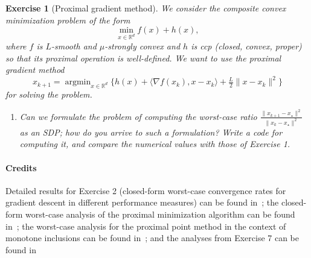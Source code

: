 \documentclass[11pt,a4paper]{article}
\newcommand{\inner}[2]{{\langle #1, #2\rangle}}
\DeclareMathOperator*{\argmin}{argmin}
\newtheorem{exercise}{Exercise}
\begin{document}
	
	\begin{exercise}[Proximal gradient method]\label{ex:pgm} We consider the composite convex minimization problem of the form
	\[ \min_{x\in\mathbb{R}^d} f(x)+h(x),\]
where $f$ is $L$-smooth and $\mu$-strongly convex and $h$ is ccp (closed, convex, proper) so that its proximal operation is well-defined. We want to use the proximal gradient method
\[ x_{k+1}=\argmin_{x\in\mathbb{R}^d}\{h(x)+\inner{\nabla f(x_k)}{x-x_k}+\tfrac{L}{2}\|x-x_k\|^2\}\]
for solving the problem.
	\begin{enumerate}
	\item Can we formulate the problem of computing the worst-case ratio $\frac{\|x_{k+1}-x_\star\|^2}{\|x_k-x_\star\|^2}$ as an SDP; how do you arrive to such a formulation? Write a code for computing it, and compare the numerical values with those of Exercise 1.
	\end{enumerate}
	\end{exercise}
%
%	
%	
	
	
	

	
\paragraph{Credits} Detailed results for Exercise 2 (closed-form worst-case convergence rates for gradient descent in different performance measures) can be found in~\cite{taylor2015exact}; the closed-form worst-case analysis of the proximal minimization algorithm can be found in~\cite{taylor2018exact}; the worst-case analysis for the proximal point method in the context of monotone inclusions can be found in~\cite{gu2020tight}; and the analyses from Exercise 7 can be found in~\cite{lieder2017convergence}
		
\end{document}
